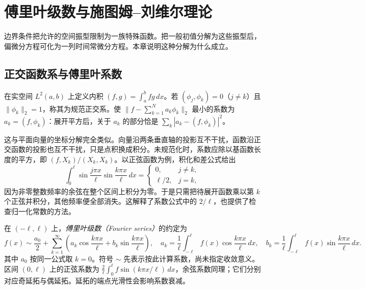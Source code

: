 \setcounter{chapter}{4} %
\chapter{傅里叶级数与施图姆--刘维尔理论}
\label{chap:fourier-series}

边界条件把允许的空间振型限制为一族特殊函数。把一般初值分解为这些振型后，偏微分方程可化为一列时间常微分方程。本章说明这种分解为什么成立。

\section{正交函数系与傅里叶系数}
在实空间 $L^2(a,b)$ 上定义内积 $(f,g)=\int_a^b fg\,dx$。若 $(\phi_j,\phi_k)=0$（$j\ne k$）且 $\|\phi_k\|_2=1$，称其为规范正交系。使 $\|f-\sum_{k=1}^N a_k\phi_k\|_2$ 最小的系数为 $a_k=(f,\phi_k)$：展开平方后，关于 $a_k$ 的部分恰是 $\sum_k|a_k-(f,\phi_k)|^2$。

这与平面向量的坐标分解完全类似。向量沿两条垂直轴的投影互不干扰，函数沿正交函数的投影也互不干扰，只是点积换成积分。未规范化时，系数应除以基函数长度的平方，即 $(f,X_k)/(X_k,X_k)$。以正弦函数为例，积化和差公式给出
\[
 \int_0^\ell\sin\frac{j\pi x}{\ell}\sin\frac{k\pi x}{\ell}\,dx
 =\begin{cases}0,&j\ne k,\\ \ell/2,&j=k,\end{cases}
\]
因为非零整数频率的余弦在整个区间上积分为零。于是只需把待展开函数乘以第 $k$ 个正弦并积分，其他频率便全部消失。这解释了系数公式中的 $2/\ell$，也提供了检查归一化常数的方法。

在 $(-\ell,\ell)$ 上，\emph{傅里叶级数（Fourier series）}的约定为
\begin{equation}
 f(x)\sim\frac{a_0}{2}+\sum_{k=1}^\infty\left(a_k\cos\frac{k\pi x}{\ell}+b_k\sin\frac{k\pi x}{\ell}\right),
 \quad
 a_k=\frac1\ell\int_{-\ell}^\ell f(x)\cos\frac{k\pi x}{\ell}\,dx,
 \quad
 b_k=\frac1\ell\int_{-\ell}^\ell f(x)\sin\frac{k\pi x}{\ell}\,dx.
 \label{eq:fourier-series-coefficients}
\end{equation}
其中 $a_0$ 按同一公式取 $k=0$。符号 $\sim$ 先表示按此计算系数，尚未指定收敛意义。区间 $(0,\ell)$ 上的正弦系数为 $\frac2\ell\int_0^\ell f\sin(k\pi x/\ell)\,dx$，余弦系数同理；它们分别对应奇延拓与偶延拓。延拓的端点光滑性会影响系数衰减。

